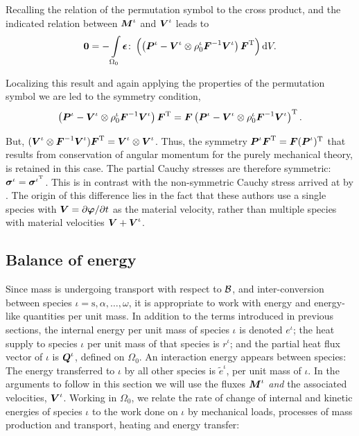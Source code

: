 \noindent Recalling the relation of the permutation symbol to the
cross product, and the indicated relation between $\mbox{\boldmath$ M$}^\iota$ and
$\mbox{\boldmath$ V$}^\iota$ leads to
\begin{equation}
{\bf 0} =
-\int\limits_{\Omega_0}\mbox{\boldmath$\epsilon$}\colon\left(\left(\mbox{\boldmath$ P$}^\iota-\mbox{\boldmath$ V$}^\iota\otimes\rho_0^\iota\mbox{\boldmath$ F$}^{-1}\mbox{\boldmath$ V$}^\iota\right)\mbox{\boldmath$ F$}^\mathrm{T}\right)\mathrm{d}V.
\end{equation}

\noindent Localizing this result and again applying the properties
of the permutation symbol we are led to the symmetry condition,
\begin{equation}
\left(\mbox{\boldmath$ P$}^\iota-\mbox{\boldmath$ V$}^\iota\otimes\rho^\iota_0\mbox{\boldmath$ F$}^{-1}\mbox{\boldmath$ V$}^\iota\right)\mbox{\boldmath$ F$}^\mathrm{T}
=
\mbox{\boldmath$ F$}\left(\mbox{\boldmath$ P$}^\iota-\mbox{\boldmath$ V$}^\iota\otimes\rho^\iota_0\mbox{\boldmath$ F$}^{-1}\mbox{\boldmath$ V$}^\iota\right)^\mathrm{T}.
\end{equation}

\noindent But, $(\mbox{\boldmath$ V$}^\iota\otimes\mbox{\boldmath$ F$}^{-1}\mbox{\boldmath$ V$}^\iota)\mbox{\boldmath$ F$}^\mathrm{T}
= \mbox{\boldmath$ V$}^\iota\otimes\mbox{\boldmath$ V$}^\iota$. Thus, the symmetry
$\mbox{\boldmath$ P$}^\iota\mbox{\boldmath$ F$}^\mathrm{T} = \mbox{\boldmath$ F$}(\mbox{\boldmath$ P$}^\iota)^\mathrm{T}$ that results
from conservation of angular momentum for the purely mechanical
theory, is retained in this case. The partial Cauchy stresses are
therefore symmetric: $\mbox{\boldmath$\sigma$}^\iota = \mbox{\boldmath$\sigma$}^{\iota^\mathrm{T}}$.
This is in contrast with the non-symmetric Cauchy stress arrived
at by \citet{EpsteinMaugin:2000}. The origin of this difference
lies in the fact that these authors use a single species with $\mbox{\boldmath$ V$}
=
\partial\mbox{\boldmath$\varphi$}/\partial t$ as the material velocity, rather than
multiple species with material velocities $\mbox{\boldmath$ V$} + \mbox{\boldmath$ V$}^\iota$.

\subsection{Balance of energy}
\label{balance-of-energy}

Since mass is undergoing transport with respect to ${\mathcal B}$, and
inter-conversion between species $\iota =
\mathrm{s},\alpha,\dots,\omega$, it is appropriate to work with
energy and energy-like quantities per unit mass. In addition to
the terms introduced in previous sections, the internal energy per
unit mass of species $\iota$ is denoted $e^\iota$; the heat supply
to species $\iota$ per unit mass of that species is $r^\iota$; and
the partial heat flux vector of $\iota$ is $\mbox{\boldmath$ Q$}^\iota$, defined on
$\Omega_0$. An interaction energy appears between species: The
energy transferred to $\iota$ by all other species is
$\tilde{e}^\iota$, per unit mass of $\iota$. In the arguments to
follow in this section we will use the fluxes $\mbox{\boldmath$ M$}^\iota$
\emph{and} the associated velocities, $\mbox{\boldmath$ V$}^\iota$. Working in
$\Omega_0$, we relate the rate of change of internal and kinetic
energies of species $\iota$ to the work done on $\iota$ by
mechanical loads, processes of mass production and transport,
heating and energy transfer:


